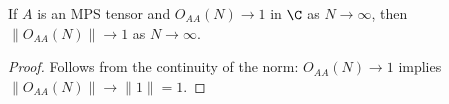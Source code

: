 \begin{lemma}\label{lem:norm_selfOverlap_tendsto}
    \leanok
    If $A$ is an MPS tensor and $O_{AA}(N) \to 1$ in $\C$ as
    $N \to \infty$, then $\|O_{AA}(N)\| \to 1$ as
    $N \to \infty$.
\end{lemma}

\begin{proof}\leanok
    Follows from the continuity of the norm:
    $O_{AA}(N) \to 1$ implies
    $\|O_{AA}(N)\| \to \|1\| = 1$.
\end{proof}
